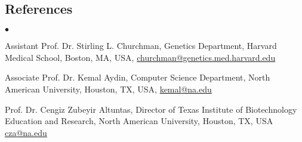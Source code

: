 \documentclass[margin,line]{res}
\newenvironment{list2}{
  \begin{list}{$\bullet$}{%
      \setlength{\itemsep}{0in}
      \setlength{\parsep}{0in} \setlength{\parskip}{0in}
      \setlength{\topsep}{0in} \setlength{\partopsep}{0in} 
      \setlength{\leftmargin}{0.2in}}}{\end{list}}
\begin{document}
\begin{resume}
\section{\sc References} 
\begin{list2}
\item Assistant Prof. Dr. Stirling L. Churchman, Genetics Department, Harvard Medical School, Boston, MA, USA, \href{churchman@genetics.med.harvard.edu}{churchman@genetics.med.harvard.edu}
\item Associate Prof. Dr. Kemal Aydin, Computer Science Department, North American University, Houston, TX, USA, \href{kemal@na.edu}{kemal@na.edu}
\item Prof. Dr. Cengiz Zubeyir Altuntas, Director of Texas Institute of Biotechnology Education and Research, North American University, Houston, TX, USA \href{cza@na.edu}{cza@na.edu} 
\end{list2}


\end{resume}
\end{document}
